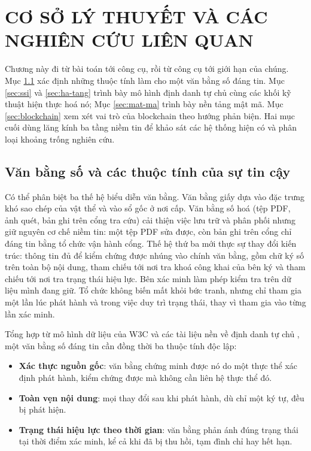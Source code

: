 \chapter{CƠ SỞ LÝ THUYẾT VÀ CÁC NGHIÊN CỨU LIÊN QUAN}
\label{chap:co-so}

Chương này đi từ bài toán tới công cụ, rồi từ công cụ tới giới hạn của chúng. Mục \ref{sec:thuoc-tinh} xác định những thuộc tính làm cho một văn bằng số đáng tin. Mục \ref{sec:ssi} và \ref{sec:ha-tang} trình bày mô hình định danh tự chủ cùng các khối kỹ thuật hiện thực hoá nó; Mục \ref{sec:mat-ma} trình bày nền tảng mật mã. Mục \ref{sec:blockchain} xem xét vai trò của blockchain theo hướng phản biện. Hai mục cuối dùng lăng kính ba tầng niềm tin để khảo sát các hệ thống hiện có và phân loại khoảng trống nghiên cứu.

\section{Văn bằng số và các thuộc tính của sự tin cậy}
\label{sec:thuoc-tinh}

Có thể phân biệt ba thế hệ biểu diễn văn bằng. Văn bằng giấy dựa vào đặc trưng khó sao chép của vật thể và vào sổ gốc ở nơi cấp. Văn bằng số hoá (tệp PDF, ảnh quét, bản ghi trên cổng tra cứu) cải thiện việc lưu trữ và phân phối nhưng giữ nguyên cơ chế niềm tin: một tệp PDF sửa được, còn bản ghi trên cổng chỉ đáng tin bằng tổ chức vận hành cổng. Thế hệ thứ ba mới thực sự thay đổi kiến trúc: thông tin đủ để kiểm chứng được nhúng vào chính văn bằng, gồm chữ ký số trên toàn bộ nội dung, tham chiếu tới nơi tra khoá công khai của bên ký và tham chiếu tới nơi tra trạng thái hiệu lực. Bên xác minh làm phép kiểm tra trên dữ liệu mình đang giữ. Tổ chức không biến mất khỏi bức tranh, nhưng chỉ tham gia một lần lúc phát hành và trong việc duy trì trạng thái, thay vì tham gia vào từng lần xác minh.

Tổng hợp từ mô hình dữ liệu của W3C \cite{W3C_VCDM2025} và các tài liệu nền về định danh tự chủ \cite{Preukschat2021, Sedlmeir2021}, một văn bằng số đáng tin cần đồng thời ba thuộc tính độc lập:

\begin{itemize}
    \item \textbf{Xác thực nguồn gốc}: văn bằng chứng minh được nó do một thực thể xác định phát hành, kiểm chứng được mà không cần liên hệ thực thể đó.
    \item \textbf{Toàn vẹn nội dung}: mọi thay đổi sau khi phát hành, dù chỉ một ký tự, đều bị phát hiện.
    \item \textbf{Trạng thái hiệu lực theo thời gian}: văn bằng phản ánh đúng trạng thái tại thời điểm xác minh, kể cả khi đã bị thu hồi, tạm đình chỉ hay hết hạn.
\end{itemize}

